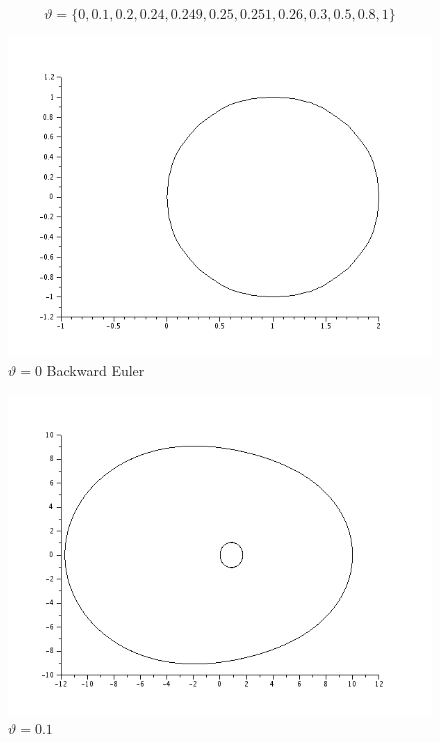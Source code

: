 \documentclass{article}
\begin{document}
\begin{itemize}
\begin{equation}
\vartheta = \{0, 0.1, 0.2, 0.24, 0.249, 0.25, 0.251, 0.26, 0.3, 0.5, 0.8, 1\} \tag{P2.6b}
\end{equation}

\begin{figure}[H]
\includegraphics[width=\textwidth]{img/ej6-1.png}
\caption{$\vartheta = 0$ Backward Euler}
\end{figure}

\begin{figure}[H]
\includegraphics[width=\textwidth]{img/ej6-2.png}
\caption{$\vartheta = 0.1$ }
\end{figure}


\end{itemize}
\end{document}
